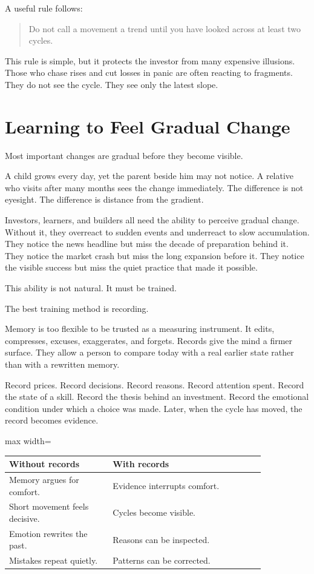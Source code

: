 A useful rule follows:

\begin{quote}
Do not call a movement a trend until you have looked across at least two cycles.
\end{quote}

This rule is simple, but it protects the investor from many expensive illusions. Those who chase rises and cut losses in panic are often reacting to fragments. They do not see the cycle. They see only the latest slope.

\section*{Learning to Feel Gradual Change}

Most important changes are gradual before they become visible.

A child grows every day, yet the parent beside him may not notice. A relative who visits after many months sees the change immediately. The difference is not eyesight. The difference is distance from the gradient.

Investors, learners, and builders all need the ability to perceive gradual change. Without it, they overreact to sudden events and underreact to slow accumulation. They notice the news headline but miss the decade of preparation behind it. They notice the market crash but miss the long expansion before it. They notice the visible success but miss the quiet practice that made it possible.

This ability is not natural. It must be trained.

The best training method is recording.

Memory is too flexible to be trusted as a measuring instrument. It edits, compresses, excuses, exaggerates, and forgets. Records give the mind a firmer surface. They allow a person to compare today with a real earlier state rather than with a rewritten memory.

Record prices. Record decisions. Record reasons. Record attention spent. Record the state of a skill. Record the thesis behind an investment. Record the emotional condition under which a choice was made. Later, when the cycle has moved, the record becomes evidence.

\begin{center}
\begin{adjustbox}{max width=\linewidth}
\begin{tabular}{p{0.34\linewidth}p{0.5\linewidth}}
\hline
Without records & With records \\
\hline
Memory argues for comfort. & Evidence interrupts comfort. \\
Short movement feels decisive. & Cycles become visible. \\
Emotion rewrites the past. & Reasons can be inspected. \\
Mistakes repeat quietly. & Patterns can be corrected. \\
\hline
\end{tabular}
\end{adjustbox}
\end{center}

